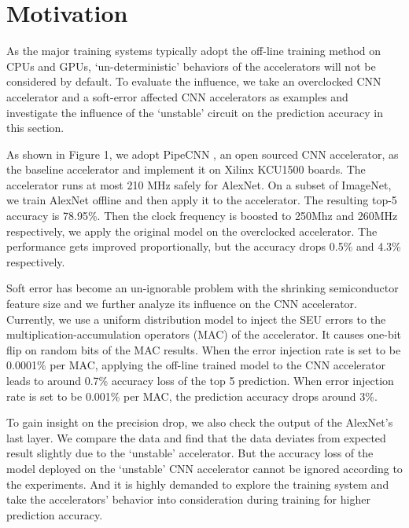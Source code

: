 \section{Motivation} \label{sec:motivation}
  As the major training systems typically adopt the off-line training method 
on CPUs and GPUs, ‘un-deterministic’ behaviors of the accelerators will not 
be considered by default. To evaluate the influence, we take an overclocked 
CNN accelerator and a soft-error affected CNN accelerators as examples and 
investigate the influence of the ‘unstable’ circuit on the prediction accuracy in this section.

  As shown in Figure 1, we adopt PipeCNN\cite{pipecnn_2} , an open sourced CNN accelerator, 
as the baseline accelerator and implement it on Xilinx KCU1500 boards. The accelerator 
runs at most 210 MHz safely for AlexNet. On a subset of ImageNet, we train AlexNet offline 
and then apply it to the accelerator. The resulting top-5 accuracy is 78.95\%. Then the clock 
frequency is boosted to 250Mhz and 260MHz respectively, we apply the original model on 
the overclocked accelerator. The performance gets improved proportionally, but the 
accuracy drops 0.5\% and 4.3\% respectively.

  Soft error has become an un-ignorable problem with the shrinking semiconductor 
feature size and we further analyze its influence on the CNN accelerator. 
Currently, we use a uniform distribution model to inject the SEU errors to the 
multiplication-accumulation operators (MAC) of the accelerator. It causes one-bit 
flip on random bits of the MAC results. When the error injection rate is set to 
be 0.0001\% per MAC, applying the off-line trained model to the CNN accelerator 
leads to around 0.7\% accuracy loss of the top 5 prediction. When error injection 
rate is set to be 0.001\% per MAC, the prediction accuracy drops around 3\%.

  To gain insight on the precision drop, we also check the output of the AlexNet’s last 
layer. We compare the data and find that the data deviates from expected result slightly 
due to the ‘unstable’ accelerator. But the accuracy loss of the model deployed on 
the ‘unstable’ CNN accelerator cannot be ignored according to the experiments. 
And it is highly demanded to explore the training 
system and take the accelerators’ behavior into consideration during training for higher prediction accuracy.


